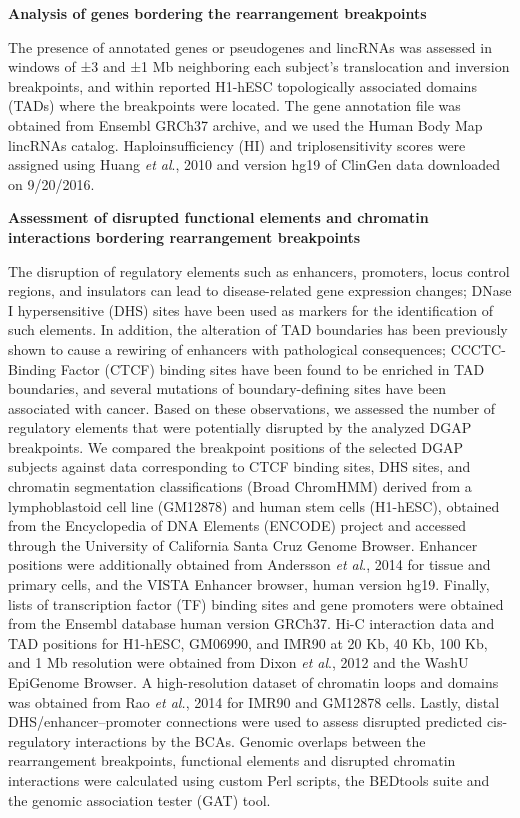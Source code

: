 \documentclass[a4paper,twoside=true,openright,parskip=full,chapterprefix=true,11pt,headings=normal,bibliography=totoc,listof=totoc,titlepage=on,captions=tableabove,draft=false]{scrreprt}
\theoremstyle{definition}
\theoremstyle{definition}
\theoremstyle{definition}
\theoremstyle{remark}
\begin{document}
\textbf{Analysis of genes bordering the rearrangement breakpoints}

The presence of annotated genes or pseudogenes and lincRNAs was assessed
in windows of ±3 and ±1 Mb neighboring each subject's translocation and
inversion breakpoints, and within reported H1-hESC topologically
associated domains (TADs)\citep{Dixon2012} where the breakpoints were
located. The gene annotation file was obtained from Ensembl GRCh37
archive,\citep{Flicek2014} and we used the Human Body Map lincRNAs
catalog.\citep{Cabili2011} Haploinsufficiency (HI) and triplosensitivity
scores were assigned using Huang \emph{et al}., 2010\citep{Huang2010}
and version hg19 of ClinGen\citep{Rehm2015} data downloaded on
9/20/2016.

\textbf{Assessment of disrupted functional elements and chromatin
interactions bordering rearrangement breakpoints}

The disruption of regulatory elements such as enhancers, promoters,
locus control regions, and insulators can lead to disease-related gene
expression changes; DNase I hypersensitive (DHS) sites have been used as
markers for the identification of such elements.\citep{Thurman2012} In
addition, the alteration of TAD boundaries has been previously shown to
cause a rewiring of enhancers with pathological
consequences;\citep{Lupianez2015, Giorgio2015, Narendra2015}
CCCTC-Binding Factor (CTCF) binding sites have been found to be enriched
in TAD boundaries,\citep{Dixon2012} and several mutations of
boundary-defining sites have been associated with
cancer.\citep{Flavahan2016, Hnisz2016} Based on these observations, we
assessed the number of regulatory elements that were potentially
disrupted by the analyzed DGAP breakpoints. We compared the breakpoint
positions of the selected DGAP subjects against data corresponding to
CTCF binding sites, DHS sites, and chromatin segmentation
classifications (Broad ChromHMM) derived from a lymphoblastoid cell line
(GM12878) and human stem cells (H1-hESC), obtained from the Encyclopedia
of DNA Elements (ENCODE) project\citep{Dunham2012} and accessed through
the University of California Santa Cruz Genome Browser.\citep{Kent2002}
Enhancer positions were additionally obtained from Andersson \emph{et
al}., 2014\citep{Andersson2014} for tissue and primary cells, and the
VISTA Enhancer browser, human version hg19.\citep{Visel2007} Finally,
lists of transcription factor (TF) binding sites and gene promoters were
obtained from the Ensembl database human version
GRCh37.\citep{Flicek2014} Hi-C interaction data and TAD positions for
H1-hESC, GM06990, and IMR90 at 20 Kb, 40 Kb, 100 Kb, and 1 Mb resolution
were obtained from Dixon \emph{et al}., 2012\citep{Dixon2012} and the
WashU EpiGenome Browser.\citep{Zhou2012} A high-resolution dataset of
chromatin loops and domains was obtained from Rao \emph{et al.}, 2014
for IMR90 and GM12878 cells.\citep{Rao2014} Lastly, distal
DHS/enhancer--promoter connections\citep{Thurman2012} were used to
assess disrupted predicted cis-regulatory interactions by the BCAs.
Genomic overlaps between the rearrangement breakpoints, functional
elements and disrupted chromatin interactions were calculated using
custom Perl scripts, the BEDtools suite\citep{Quinlan2010} and the
genomic association tester (GAT) tool.\citep{Heger2013}
\end{document}
